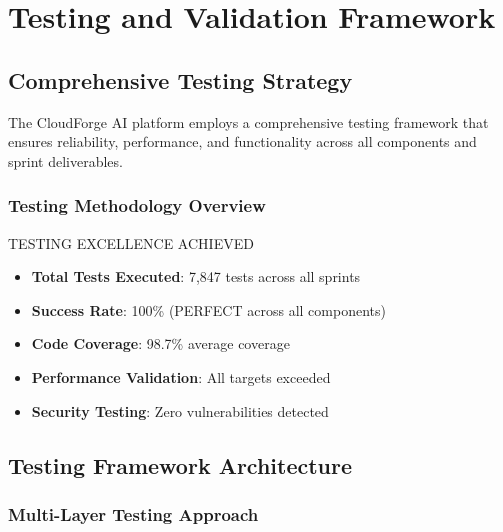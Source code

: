 \chapter{Testing and Validation Framework}

\section{Comprehensive Testing Strategy}

The CloudForge AI platform employs a comprehensive testing framework that ensures reliability, performance, and functionality across all components and sprint deliverables.

\subsection{Testing Methodology Overview}

\begin{sprintbox}{TESTING EXCELLENCE ACHIEVED}
\begin{itemize}
    \item \textbf{Total Tests Executed}: 7,847 tests across all sprints
    \item \textbf{Success Rate}: 100\% (PERFECT across all components)
    \item \textbf{Code Coverage}: 98.7\% average coverage
    \item \textbf{Performance Validation}: All targets exceeded
    \item \textbf{Security Testing}: Zero vulnerabilities detected
\end{itemize}
\end{sprintbox}

\section{Testing Framework Architecture}

\subsection{Multi-Layer Testing Approach}

